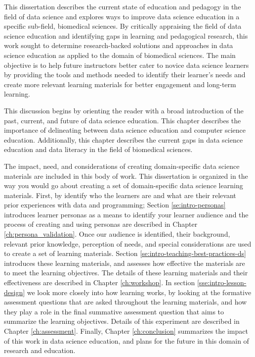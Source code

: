 \documentclass[010-intro.tex]{subfiles}
\begin{document}
This dissertation describes the current state of education and pedagogy in the field of data science
and explores ways to improve data science education in a specific sub-field, biomedical sciences.
By critically appraising the field of data science education
and identifying gaps in learning and pedagogical research,
this work sought to determine research-backed solutions and approaches in data science education
as applied to the domain of biomedical sciences.
The main objective is to help future instructors better cater to novice data science learners
by providing the tools and methods needed to identify their learner's needs and create
more relevant learning materials for better engagement and long-term learning.

This discussion begins by orienting the reader with
a broad introduction of the past, current, and future of data science education.
This chapter describes the importance of delineating between
data science education and computer science education.
Additionally, this chapter describes the current gaps in
data science education and data literacy in the field of biomedical sciences.

The impact, need, and considerations of creating domain-specific data science materials
are included in this body of work.
This dissertation is organized in the way you would go about creating
a set of domain-specific data science learning materials.
First, by identify who the learners are and what are their relevant prior experiences with
data and programming;
Section \ref{se:intro-personas} introduces learner personas as a means to identify your learner audience
and the process of creating and using personas are described in Chapter \ref{ch:persona_validation}.
Once our audience is identified,
their background, relevant prior knowledge, perception of needs, and special considerations
are used to create a set of learning materials.
Section \ref{se:intro-teaching-best-practices-ds} introduces these learning materials,
and assesses how effective the materials are to meet the learning objectives.
The details of these learning materials and their effectiveness are described in Chapter \ref{ch:workshop}.
In section \ref{sse:intro-lesson-design} we look more closely into how learning works,
by looking at the formative assessment questions that are asked throughout the learning materials,
and how they play a role in the final summative assessment question that aims to summarize the learning objectives.
Details of this experiment are described in Chapter \ref{ch:assessment}.
Finally, Chapter \ref{ch:conclusion} summarizes the impact of this work in data science education,
and plans for the future in this domain of research and education.
\end{document}
